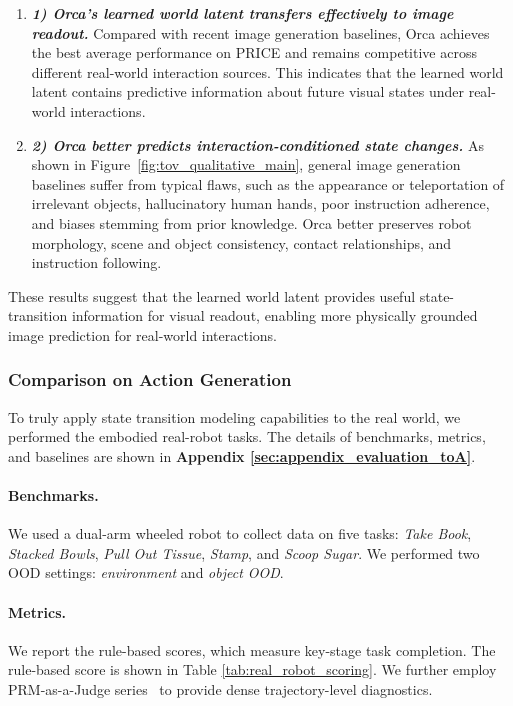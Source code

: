 \documentclass{llmxive}
\begin{document}
\begin{enumerate}[
    leftmargin=1.35em,
    itemsep=0.35em,
    topsep=0.35em,
    parsep=0em
]
    \item[] \textit{\textbf{1) Orca's learned world latent transfers effectively to image readout.}} 
    Compared with recent image generation baselines, Orca achieves the best average performance on PRICE and remains competitive across different real-world interaction sources. 
    This indicates that the learned world latent contains predictive information about future visual states under real-world interactions.

    \item[] \textit{\textbf{2) Orca better predicts interaction-conditioned state changes.}} 
    As shown in Figure~\ref{fig:tov_qualitative_main}, general image generation baselines suffer from typical flaws, such as the appearance or teleportation of irrelevant objects, hallucinatory human hands, poor instruction adherence, and biases stemming from prior knowledge. Orca better preserves robot morphology, scene and object consistency, contact relationships, and instruction following.
\end{enumerate}

These results suggest that the learned world latent provides useful state-transition information for visual readout, enabling more physically grounded image prediction for real-world interactions.


\subsubsection{Comparison on Action Generation}\label{sec:evaluation_toA}
To truly apply state transition modeling capabilities to the real world, we performed the embodied real-robot tasks. The details of benchmarks, metrics, and baselines are shown in \textbf{Appendix \ref{sec:appendix_evaluation_toA}}.

\paragraph{Benchmarks.} 

We used a dual-arm wheeled robot to collect data on five tasks: \textit{Take Book}, \textit{Stacked Bowls}, \textit{Pull Out Tissue}, \textit{Stamp}, and \textit{Scoop Sugar}. We performed two OOD settings: \textit{environment} and \textit{object OOD}. 

\paragraph{Metrics.} 
We report the rule-based scores, which measure key-stage task completion. The rule-based score is shown in Table \ref{tab:real_robot_scoring}.
We further employ PRM-as-a-Judge series~\citep{PRM-as-a-Judge, judge1.5} to provide dense trajectory-level diagnostics.
\end{document}
